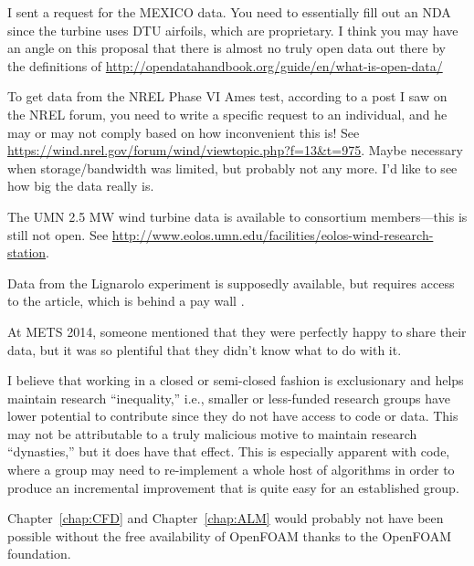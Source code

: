

I sent a request for the MEXICO data. You need to essentially fill out an NDA
since the turbine uses DTU airfoils, which are proprietary. I think you may have
an angle on this proposal that there is almost no truly open data out there by
the definitions of \url{http://opendatahandbook.org/guide/en/what-is-open-data/}

To get data from the NREL Phase VI Ames test, according to a post I saw on the
NREL forum, you need to write a specific request to an individual, and he may or
may not comply based on how inconvenient this is! See
\url{https://wind.nrel.gov/forum/wind/viewtopic.php?f=13&t=975}. Maybe necessary
when storage/bandwidth was limited, but probably not any more. I'd like to see
how big the data really is.

The UMN 2.5 MW wind turbine data is available to consortium members---this is
still not open. See
\url{http://www.eolos.umn.edu/facilities/eolos-wind-research-station}.

Data from the Lignarolo experiment is supposedly available, but requires access
to the article, which is behind a pay wall \cite{Lignarolo2014}.

At METS 2014, someone mentioned that they were perfectly happy to share their
data, but it was so plentiful that they didn't know what to do with it.

I believe that working in a closed or semi-closed fashion is exclusionary and
helps maintain research ``inequality,'' i.e., smaller or less-funded research
groups have lower potential to contribute since they do not have access to code
or data. This may not be attributable to a truly malicious motive to maintain
research ``dynasties,'' but it does have that effect. This is especially
apparent with code, where a group may need to re-implement a whole host of
algorithms in order to produce an incremental improvement that is quite easy for
an established group.

Chapter~\ref{chap:CFD} and Chapter~\ref{chap:ALM} would probably not have been
possible without the free availability of OpenFOAM thanks to the OpenFOAM
foundation.



